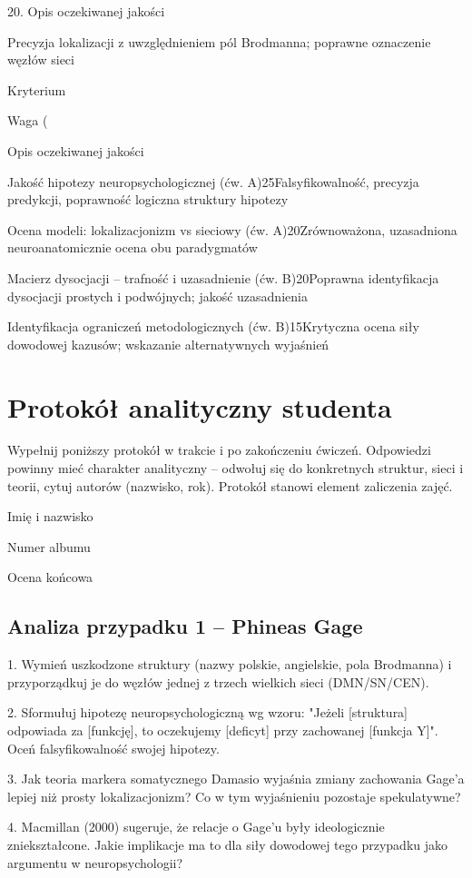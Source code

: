 \documentclass[11pt,a4paper]{article}
\begin{document}
20. Opis oczekiwanej jakości 

Precyzja lokalizacji z uwzględnieniem pól Brodmanna; poprawne oznaczenie węzłów sieci

Kryterium

Waga (%

Opis oczekiwanej jakości

Jakość hipotezy neuropsychologicznej (ćw. A)25Falsyfikowalność, precyzja predykcji, poprawność logiczna struktury hipotezy

Ocena modeli: lokalizacjonizm vs sieciowy (ćw. A)20Zrównoważona, uzasadniona neuroanatomicznie ocena obu paradygmatów

Macierz dysocjacji – trafność i uzasadnienie (ćw. B)20Poprawna identyfikacja dysocjacji prostych i podwójnych; jakość uzasadnienia

Identyfikacja ograniczeń metodologicznych (ćw. B)15Krytyczna ocena siły dowodowej kazusów; wskazanie alternatywnych wyjaśnień

\section{Protokół analityczny studenta}

Wypełnij poniższy protokół w trakcie i po zakończeniu ćwiczeń. Odpowiedzi powinny mieć charakter analityczny – odwołuj się do konkretnych struktur, sieci i teorii, cytuj autorów (nazwisko, rok). Protokół stanowi element zaliczenia zajęć.

Imię i nazwisko

Numer albumu

Ocena końcowa

\subsection{Analiza przypadku 1 – Phineas Gage}

1. Wymień uszkodzone struktury (nazwy polskie, angielskie, pola Brodmanna) i przyporządkuj je do węzłów jednej z trzech wielkich sieci (DMN/SN/CEN).

2. Sformułuj hipotezę neuropsychologiczną wg wzoru: "Jeżeli [struktura] odpowiada za [funkcję], to oczekujemy [deficyt] przy zachowanej [funkcja Y]". Oceń falsyfikowalność swojej hipotezy.

3. Jak teoria markera somatycznego Damasio wyjaśnia zmiany zachowania Gage'a lepiej niż prosty lokalizacjonizm? Co w tym wyjaśnieniu pozostaje spekulatywne?

4. Macmillan (2000) sugeruje, że relacje o Gage'u były ideologicznie zniekształcone. Jakie implikacje ma to dla siły dowodowej tego przypadku jako argumentu w neuropsychologii?
\end{document}
